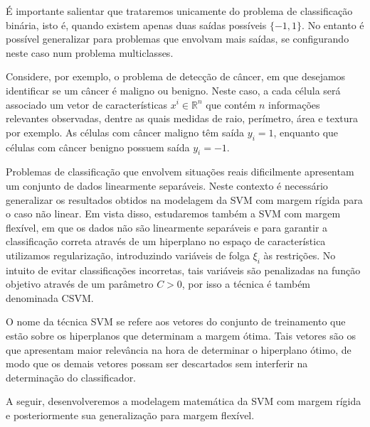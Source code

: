 \documentclass[12pt,a4paper]{scrartcl}
\def\RR{\mathds{R}}
\theoremstyle{definition}%
\begin{document}
É importante salientar que trataremos unicamente do problema de classificação binária, isto é, quando existem apenas duas saídas possíveis $\{-1,1\}$. No entanto é possível generalizar para problemas que envolvam mais saídas, se configurando neste caso num problema multiclasses. 

Considere, por exemplo, o problema de detecção de câncer, em que desejamos identificar se um câncer é maligno ou benigno. Neste caso, a cada célula será associado um vetor de características $x^{i} \in \RR^{n}$ que contém $n$ informações relevantes observadas, dentre as quais medidas de raio, perímetro, área e textura por exemplo. As células com câncer maligno têm saída $y_{i} = 1$, enquanto que células com câncer benigno possuem saída $y_{i} = -1$. 

Problemas de classificação que envolvem situações reais dificilmente apresentam um conjunto de dados linearmente separáveis. Neste contexto é necessário generalizar os resultados obtidos na modelagem da SVM com margem rígida para o caso não linear. Em vista disso, estudaremos também a SVM com margem flexível, em que os dados não são linearmente separáveis e para garantir a classificação correta através de um hiperplano no espaço de característica utilizamos regularização, introduzindo variáveis de folga $\xi_{i}$ às restrições. No intuito de evitar classificações incorretas, tais variáveis são penalizadas na função objetivo através de um parâmetro $C>0$, por isso a técnica é também denominada CSVM.

O nome da técnica SVM se refere aos vetores do conjunto de treinamento que estão sobre os hiperplanos que determinam a margem ótima. Tais vetores são os que apresentam maior relevância na hora de determinar o hiperplano ótimo, de modo que os demais vetores possam ser descartados sem interferir na determinação do classificador. 

A seguir, desenvolveremos a modelagem matemática da SVM com margem rígida e posteriormente sua generalização para margem flexível.


\end{document}
